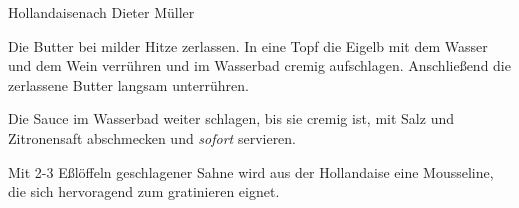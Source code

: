 \begin{recipe}{Hollandaise}{nach Dieter Müller}
  \label{Hollandaise}
  \inglist

  \steps
  Die Butter bei milder Hitze zerlassen. In eine Topf die Eigelb mit dem Wasser und dem
  Wein verrühren und im Wasserbad cremig aufschlagen. Anschließend die zerlassene Butter
  langsam unterrühren.

  Die Sauce im Wasserbad weiter schlagen, bis sie cremig ist, mit Salz und Zitronensaft
  abschmecken und \textit{sofort} servieren.

  Mit 2-3 Eßlöffeln geschlagener Sahne wird aus der Hollandaise eine Mousseline, die sich
  hervoragend zum gratinieren eignet.
\end{recipe}
